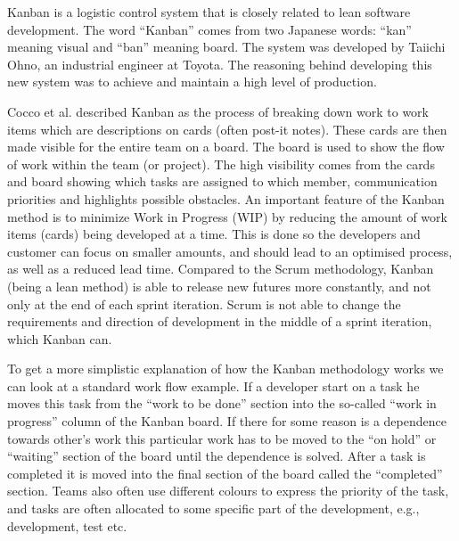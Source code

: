 Kanban is a logistic control system that is closely related to lean software development. The word ``Kanban'' comes from two Japanese words: ``kan'' meaning visual and ``ban'' meaning board. The system was developed by Taiichi Ohno, an industrial engineer at Toyota. The reasoning behind developing this new system was to achieve and maintain a high level of production.


Cocco et al. described Kanban as the process of breaking down work to work items which are descriptions on cards (often post-it notes). These cards are then made visible for the entire team on a board. The board is used to show the flow of work within the team (or project). The high visibility comes from the cards and board showing which tasks are assigned to which member, communication priorities and highlights possible obstacles. An important feature of the Kanban method is to minimize Work in Progress (WIP) by reducing the amount of work items (cards) being developed at a time. This is done so the developers and customer can focus on smaller amounts, and should lead to an optimised process, as well as a reduced lead time. Compared to the Scrum methodology, Kanban (being a lean method) is able to release new futures more constantly, and not only at the end of each sprint iteration. Scrum is not able to change the requirements and direction of development in the middle of a sprint iteration, which Kanban can.

To get a more simplistic explanation of how the Kanban methodology works we can look at a standard work flow example. If a developer start on a task he moves this task from the ``work to be done'' section into the so-called ``work in progress'' column of the Kanban board. If there for some reason is a dependence towards other's work this particular work has to be moved to the ``on hold'' or ``waiting'' section of the board until the dependence is solved. After a task is completed it is moved into the final section of the board called the ``completed'' section. Teams also often use different colours to express the priority of the task, and tasks are often allocated to some specific part of the development, e.g., development, test etc. 



